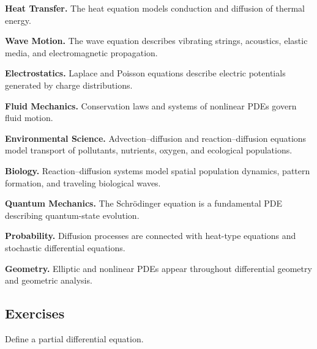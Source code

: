 \begin{applicationbox}

\textbf{Heat Transfer.}
The heat equation models conduction and diffusion of thermal energy.

\medskip

\textbf{Wave Motion.}
The wave equation describes vibrating strings, acoustics, elastic media,
and electromagnetic propagation.

\medskip

\textbf{Electrostatics.}
Laplace and Poisson equations describe electric potentials generated by
charge distributions.

\medskip

\textbf{Fluid Mechanics.}
Conservation laws and systems of nonlinear PDEs govern fluid motion.

\medskip

\textbf{Environmental Science.}
Advection--diffusion and reaction--diffusion equations model transport of
pollutants, nutrients, oxygen, and ecological populations.

\medskip

\textbf{Biology.}
Reaction--diffusion systems model spatial population dynamics, pattern
formation, and traveling biological waves.

\medskip

\textbf{Quantum Mechanics.}
The Schrödinger equation is a fundamental PDE describing quantum-state
evolution.

\medskip

\textbf{Probability.}
Diffusion processes are connected with heat-type equations and stochastic
differential equations.

\medskip

\textbf{Geometry.}
Elliptic and nonlinear PDEs appear throughout differential geometry and
geometric analysis.

\end{applicationbox}

\subsection{Exercises}
\label{subsec:pde-exercises}

\begin{exercise}[1]
Define a partial differential equation.
\end{exercise}

